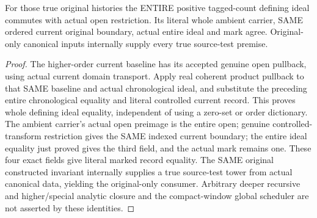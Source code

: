 \begin{theorem}
\label{hir:original-positive-tagged-companion-count-entire-open-marked-record}
\leanok
{}
For those true original histories the ENTIRE positive tagged-count defining
ideal commutes with actual open restriction. Its literal whole ambient carrier,
SAME ordered current original boundary, actual entire ideal and mark agree.
Original-only canonical inputs internally supply every true source-test premise.
\end{theorem}
\begin{proof}
The higher-order current baseline has its accepted genuine open pullback,
using actual current domain transport. Apply real coherent product pullback
to that SAME baseline and actual chronological ideal, and substitute the
preceding entire chronological equality and literal controlled current record.
This proves whole defining ideal equality, independent of using a zero-set
or order dictionary. The ambient carrier's actual open preimage is the entire
open; genuine controlled-transform restriction gives the SAME indexed current
boundary; the entire ideal equality just proved gives the third field, and
the actual mark remains one. These four exact fields give literal marked
record equality. The SAME original constructed invariant internally supplies
a true source-test tower from actual canonical data, yielding the original-only
consumer. Arbitrary deeper recursive and higher/special analytic closure and
the compact-window global scheduler are not asserted by these identities.
\end{proof}

